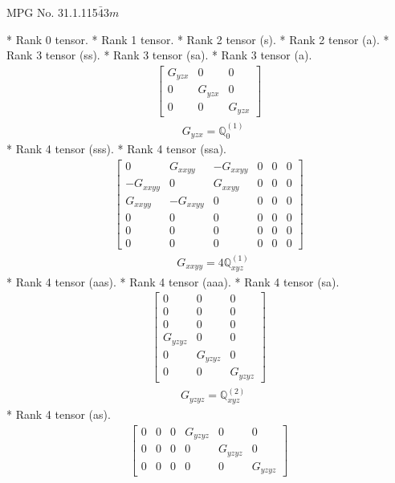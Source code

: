 \documentclass[fleqn,8pt,landscape]{jsarticle}
\begin{document}
\setcounter{MaxMatrixCols}{32}

\renewcommand{\tablename}{Table~}
\renewcommand{\figurename}{Figure~}
\begin{center}
\LARGE
MPG No. 31.1.115\quad$\bar{4}3m$
\end{center}
* Rank 0 tensor.
* Rank 1 tensor.
* Rank 2 tensor (s).
* Rank 2 tensor (a).
* Rank 3 tensor (ss).
* Rank 3 tensor (sa).
* Rank 3 tensor (a).
\begin{align*}
\begin{bmatrix} G_{yzx} & 0 & 0 \\ 0 & G_{yzx} & 0 \\ 0 & 0 & G_{yzx} \end{bmatrix}
\end{align*}
\begin{align*}
& G_{yzx} = \mathbb{Q}_{0}^{(1)}
\end{align*}
* Rank 4 tensor (sss).
* Rank 4 tensor (ssa).
\begin{align*}
\begin{bmatrix} 0 & G_{xxyy} & - G_{xxyy} & 0 & 0 & 0 \\ - G_{xxyy} & 0 & G_{xxyy} & 0 & 0 & 0 \\ G_{xxyy} & - G_{xxyy} & 0 & 0 & 0 & 0 \\ 0 & 0 & 0 & 0 & 0 & 0 \\ 0 & 0 & 0 & 0 & 0 & 0 \\ 0 & 0 & 0 & 0 & 0 & 0 \end{bmatrix}
\end{align*}
\begin{align*}
& G_{xxyy} = 4 \mathbb{Q}_{xyz}^{(1)}
\end{align*}
* Rank 4 tensor (aas).
* Rank 4 tensor (aaa).
* Rank 4 tensor (sa).
\begin{align*}
\begin{bmatrix} 0 & 0 & 0 \\ 0 & 0 & 0 \\ 0 & 0 & 0 \\ G_{yzyz} & 0 & 0 \\ 0 & G_{yzyz} & 0 \\ 0 & 0 & G_{yzyz} \end{bmatrix}
\end{align*}
\begin{align*}
& G_{yzyz} = \mathbb{Q}_{xyz}^{(2)}
\end{align*}
* Rank 4 tensor (as).
\begin{align*}
\begin{bmatrix} 0 & 0 & 0 & G_{yzyz} & 0 & 0 \\ 0 & 0 & 0 & 0 & G_{yzyz} & 0 \\ 0 & 0 & 0 & 0 & 0 & G_{yzyz} \end{bmatrix}
\end{align*}
\end{document}

